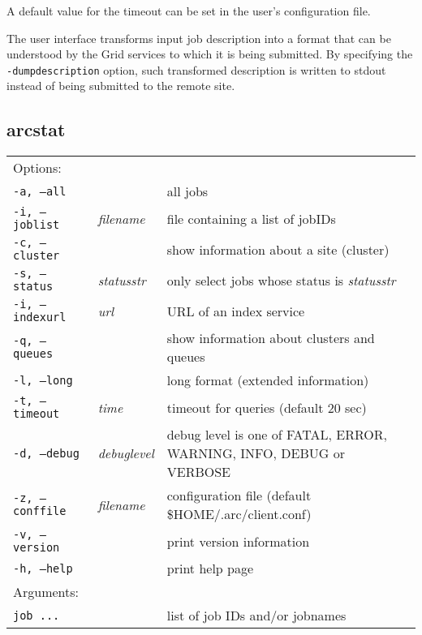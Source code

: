 A default value for the timeout can be set in the user's configuration file.

The user interface transforms input job description into a format
that can be understood by the Grid services to which it is being
submitted. By specifying the \verb#-dumpdescription# option, such transformed
description is written to stdout instead of being submitted to the remote site.




\subsection{arcstat}
\label{sec:arcstat}

\begin{shaded}
\end{shaded}
\begin{longtable}{llp{8cm}}
   Options:&&\\
   \texttt{-a, --all}& & all jobs\\
   \texttt{-i, --joblist}& \textit{filename}& file containing a list of jobIDs\\
   \texttt{-c, --cluster}& & show information about a site (cluster)\\
   \texttt{-s, --status}& \textit{statusstr} &only select jobs whose status is \textit{statusstr}\\
   \texttt{-i, --indexurl}& \textit{url} &URL of an index service\\
   \texttt{-q, --queues}&&show information about clusters and queues\\
   \texttt{-l, --long}& & long format (extended information)\\
   \texttt{-t, --timeout}& \textit{time}& timeout for queries (default 20 sec)\\
   \texttt{-d, --debug}& \textit{debuglevel}&debug level is one of  FATAL, ERROR, WARNING, INFO, DEBUG or VERBOSE\\
   \texttt{-z, --conffile}&\textit{filename}& configuration file (default {\$}HOME/.arc/client.conf)\\
   \texttt{-v, --version}& & print version information\\
   \texttt{-h, --help}& & print help page\\
   Arguments:&&\\
   \texttt{job ...} && list of job IDs and/or jobnames\\
\end{longtable}

